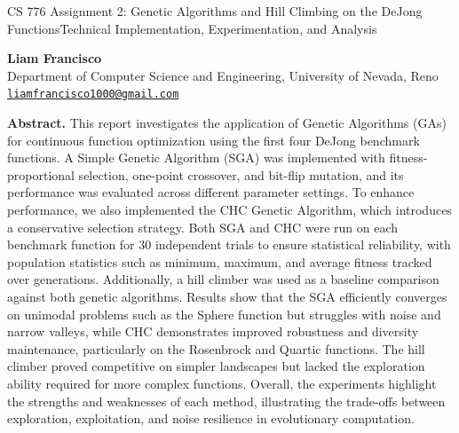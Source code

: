 \documentclass[11pt]{article}
\begin{document}
\linespread{1.2}\selectfont

\begin{center}

\begin{LARGE}
CS 776 Assignment 2: Genetic Algorithms and Hill Climbing on the DeJong Functions\vspace*{0.3cm}\linebreak Technical Implementation, Experimentation, and Analysis
\end{LARGE}

\vspace*{1cm}

\textbf{Liam Francisco} \\
Department of Computer Science and Engineering, University of Nevada, Reno \\
\href{mailto:liamfrancisco1000@gmail.com}{\tt liamfrancisco1000@gmail.com}

\vspace*{0.5cm}


\vspace*{0.8cm}


\end{center}
%
\noindent
\textbf{Abstract.}
This report investigates the application of Genetic Algorithms (GAs) for continuous function optimization using the first four DeJong benchmark functions. A Simple Genetic Algorithm (SGA) was implemented with fitness-proportional selection, one-point crossover, and bit-flip mutation, and its performance was evaluated across different parameter settings. To enhance performance, we also implemented the CHC Genetic Algorithm, which introduces a conservative selection strategy. Both SGA and CHC were run on each benchmark function for 30 independent trials to ensure statistical reliability, with population statistics such as minimum, maximum, and average fitness tracked over generations. Additionally, a hill climber was used as a baseline comparison against both genetic algorithms. Results show that the SGA efficiently converges on unimodal problems such as the Sphere function but struggles with noise and narrow valleys, while CHC demonstrates improved robustness and diversity maintenance, particularly on the Rosenbrock and Quartic functions. The hill climber proved competitive on simpler landscapes but lacked the exploration ability required for more complex functions. Overall, the experiments highlight the strengths and weaknesses of each method, illustrating the trade-offs between exploration, exploitation, and noise resilience in evolutionary computation.
\vspace*{0.3cm}
\end{document}
